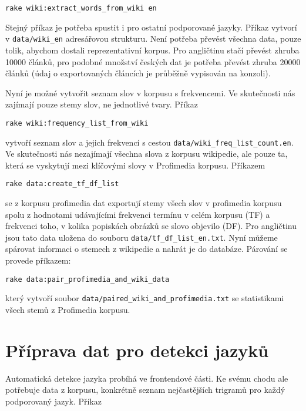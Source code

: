 \begin{lstlisting}
rake wiki:extract_words_from_wiki en
\end{lstlisting}

Stejný příkaz je potřeba spustit i pro ostatní podporované jazyky. Příkaz vytvorí v \lstinline{data/wiki_en} adresářovou strukturu. Není potřeba převést všechna data, pouze tolik, abychom dostali reprezentativní korpus. Pro angličtinu stačí převést zhruba 10000 článků, pro podobné množství českých dat je potřeba převést zhruba 20000 článků (údaj o exportovaných článcích je průběžně vypisován na konzoli).

Nyní je možné vytvořit seznam slov v korpusu s frekvencemi. Ve skutečnosti nás zajímají pouze stemy slov, ne jednotlivé tvary. Příkaz

\begin{lstlisting}
rake wiki:frequency_list_from_wiki
\end{lstlisting}

vytvoří seznam slov a jejich frekvencí s cestou \lstinline{data/wiki_freq_list_count.en}. Ve skutečnosti nás nezajímají všechna slova z korpusu wikipedie, ale pouze ta, která se vyskytují mezi klíčovými slovy v Profimedia korpusu. Příkazem

\begin{lstlisting}
rake data:create_tf_df_list
\end{lstlisting}

se z korpusu profimedia dat exportují stemy všech slov v profimedia korpusu spolu z hodnotami udávajícími frekvenci termínu v celém korpusu (TF) a frekvenci toho, v kolika popiskách obrázků se slovo objevilo (DF). Pro angličtinu jsou tato data uložena do souboru \lstinline{data/tf_df_list_en.txt}. Nyní můžeme spárovat informaci o stemech z wikipedie a nahrát je do databáze. Párování se provede příkazem:

\begin{lstlisting}
rake data:pair_profimedia_and_wiki_data
\end{lstlisting}

který vytvoří soubor \lstinline{data/paired_wiki_and_profimedia.txt} se statistikami všech stemů z Profimedia korpusu.


\section{Příprava dat pro detekci jazyků}

Automatická detekce jazyka probíhá ve frontendové části. Ke svému chodu ale potřebuje data z korpusu, konkrétně seznam nejčastějších trigramů pro každý podporovaný jazyk. Příkaz

